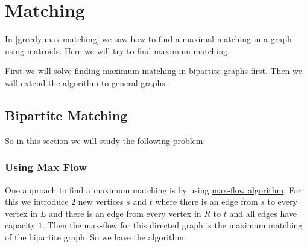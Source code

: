 \chapter{Matching}
In \autoref{greedy:max-matching} we saw how to find a maximal matching in  a graph using matroids. Here we will try to find maximum matching.

\begin{algoprob}
\end{algoprob}

First we will solve finding maximum matching in bipartite graphs first. Then we will extend the algorithm to general graphs.
\section{Bipartite Matching}
So in this section we will study the following problem:
\begin{algoprob}
\end{algoprob}
\subsection{Using Max Flow}
One approach to find a maximum matching is by using \hyperref[max-flow]{max-flow algorithm}. For this we introduce 2 new vertices $s$ and $t$ where there is an edge from $s$ to every vertex in $L$ and there is an edge from every vertex in $R$ to $t$ and all edges have capacity $1$. Then the max-flow for this directed graph is the maximum matching of the bipartite graph. So we have the algorithm:

\begin{algorithm}\DontPrintSemicolon
	\caption{}

\end{algorithm}

